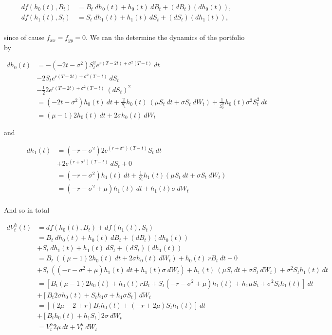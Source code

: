 \documentclass[
]{book}
\begin{document}
\begin{align*}
df(h_0(t),B_t)&=B_t\ dh_0(t)+h_0(t)\ dB_t+(dB_t)(dh_0(t)),\\
df(h_1(t),S_t)&=S_t\ dh_1(t)+h_1(t)\ dS_t+(dS_t)(dh_1(t)),\\
\end{align*}

since of cause \(f_{xx}=f_{yy}=0\). We can the determine the dynamics of the portfolio by

\begin{align*}
dh_0(t)&=-(-2t-\sigma^2)S_t^2e^{r(T-2t)+\sigma^2(T-t)}\ dt\\
&-2S_te^{r(T-2t)+\sigma^2(T-t)}\ dS_t\\
&-\frac{1}{2}2e^{r(T-2t)+\sigma^2(T-t)}\ (dS_t)^2\\
&=(-2t-\sigma^2)h_0(t)\ dt+\frac{2}{S_t}h_0(t)\ (\mu S_t\ dt+\sigma S_t\ dW_t)+\frac{1}{S_t^2}h_0(t) \sigma^2S_t^2\ dt\\
&=(\mu-1)2h_0(t)\ dt+2\sigma h_0(t)\ dW_t
\end{align*}

and

\begin{align*}
dh_1(t)&=(-r-\sigma^2)2e^{(r+\sigma^2)(T-t)}S_t\ dt\\
&+2e^{(r+\sigma^2)(T-t)}\ dS_t+0\\
&=(-r-\sigma^2)h_1(t)\ dt+\frac{1}{S_t}h_1(t)(\mu S_t\ dt+\sigma S_t\ dW_t)\\
&=(-r-\sigma^2+\mu)h_1(t)\ dt+h_1(t)\sigma \ dW_t\\
\end{align*}

And so in total

\begin{align*}
dV_t^h(t)&=df(h_0(t),B_t)+df(h_1(t),S_t)\\
&=B_t\ dh_0(t)+h_0(t)\ dB_t+(dB_t)(dh_0(t))\\
&+S_t\ dh_1(t)+h_1(t)\ dS_t+(dS_t)(dh_1(t))\\
&=B_t\ ((\mu-1)2h_0(t)\ dt+2\sigma h_0(t)\ dW_t)+h_0(t)\ rB_t\ dt+0\\
&+S_t\ ((-r-\sigma^2+\mu)h_1(t)\ dt+h_1(t)\sigma \ dW_t)+h_1(t)\ (\mu S_t\ dt+\sigma S_t\ dW_t)+\sigma^2S_th_1(t)\ dt\\
&=\left[B_t(\mu-1)2h_0(t)+h_0(t)rB_t+S_t(-r-\sigma^2+\mu)h_1(t)+h_1\mu S_t+\sigma^2S_th_1(t)\right]\ dt\\
&+\left[B_t2\sigma h_0(t)+S_th_1\sigma+h_1\sigma S_t\right]\ dW_t\\
&=\left[(2\mu-2+r)B_th_0(t)+(-r+2\mu)S_th_1(t)\right]\ dt\\
&+\left[B_t h_0(t)+h_1 S_t\right]2\sigma\ dW_t\\
&=V_t^h2\mu\ dt+V_t^h\ dW_t
\end{align*}
\end{document}
